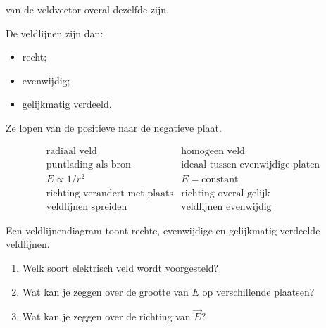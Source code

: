 \documentclass{ximera}
\begin{document}
van de veldvector overal dezelfde zijn.


De veldlijnen zijn dan:

\begin{itemize}
  \item recht;
  \item evenwijdig;
  \item gelijkmatig verdeeld.
\end{itemize}


Ze lopen van de positieve naar de negatieve plaat.




\[
\boxed{
\begin{array}{c|c}
\text{radiaal veld} & \text{homogeen veld}\\
\hline
\text{puntlading als bron}
&
\text{ideaal tussen evenwijdige platen}
\\[1mm]
E\propto1/r^2
&
E=\text{constant}
\\[1mm]
\text{richting verandert met plaats}
&
\text{richting overal gelijk}
\\[1mm]
\text{veldlijnen spreiden}
&
\text{veldlijnen evenwijdig}
\end{array}
}
\]


\begin{oefening}{\oefU\ESS}

Een veldlijnendiagram toont rechte, evenwijdige en gelijkmatig
verdeelde veldlijnen.

\begin{enumerate}
  \item Welk soort elektrisch veld wordt voorgesteld?
  \item Wat kan je zeggen over de grootte van $E$ op verschillende
        plaatsen?
  \item Wat kan je zeggen over de richting van $\vec E$?
\end{enumerate}

\end{oefening}



\end{document}
